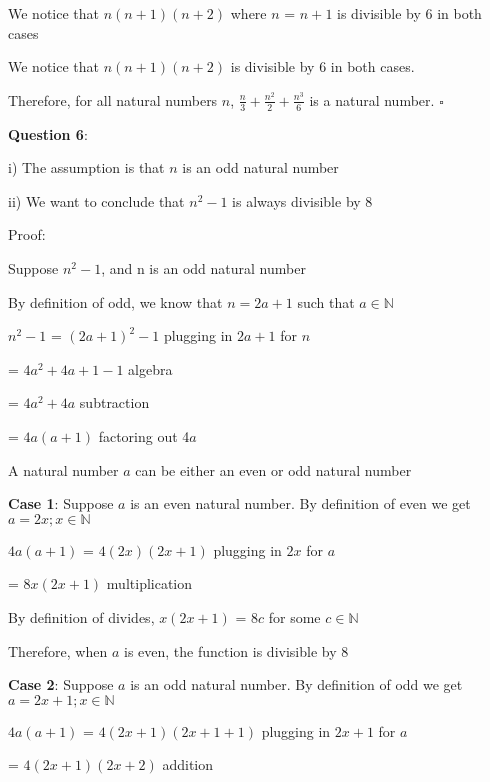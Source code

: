 \documentclass{article} %
\newcommand{\question}[2][]{\begin{flushleft}
        \textbf{Question #1}: \textit{#2}

\end{flushleft}}
\begin{document}
    We notice that $n(n + 1)(n + 2)$ where $n$ = $n + 1$ is divisible by 6 in both cases

    We notice that $n(n + 1)(n + 2)$ is divisible by 6 in both cases.

    Therefore, for all natural numbers $n$, $\frac{n}{3} + \frac{n^2}{2} + \frac{n^3}{6}$ is a natural number. $\square$

    \question[6]{}

    i) The assumption is that $n$ is an odd natural number

    ii) We want to conclude that $n^2 -1$ is always divisible by 8

    Proof:

    Suppose $n^2-1$, and n is an odd natural number
    
    By definition of odd, we know that $n = 2a+1$ such that $a \in \mathbb{N}$

    $n^2-1$ = $(2a+1)^2-1$ \tabto*{5cm}plugging in $2a + 1$ for $n$

    \tabto*{1.64cm} = $4a^2 + 4a + 1 -1$ \tabto*{5cm}algebra

    \tabto*{1.64cm} = $4a^2 + 4a$ \tabto*{5cm}subtraction

    \tabto*{1.64cm} = $4a(a + 1)$ \tabto*{5cm}factoring out 4$a$

    A natural number $a$ can be either an even or odd natural number 

    \vspace*{0.2cm}

    \textbf{Case 1}: Suppose $a$ is an even natural number. By definition of even we get $a = 2x; x \in \mathbb{N}$

    $4a(a + 1)$ = $4(2x)(2x + 1)$ \tabto*{5cm}plugging in $2x$ for $a$

    \tabto*{2.08cm} = $8x(2x + 1)$ \tabto*{5cm}multiplication

    By definition of divides, $x(2x + 1)$ = $8c$ for some $c \in \mathbb{N}$

    Therefore, when $a$ is even, the function is divisible by 8

    \vspace*{0.2cm}

    \textbf{Case 2}: Suppose $a$ is an odd natural number. By definition of odd we get $a = 2x + 1; x \in \mathbb{N}$

    $4a(a + 1)$ = $4(2x + 1)(2x + 1+ 1)$ \tabto*{6cm}plugging in $2x + 1$ for $a$

    \tabto*{2.08cm} = $4(2x + 1)(2x + 2)$ \tabto*{6cm}addition
\end{document}
